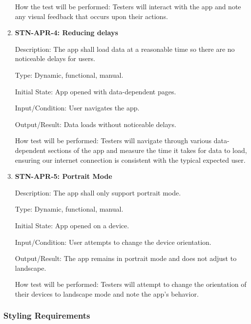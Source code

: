 \documentclass[12pt, titlepage]{article}
\begin{document}
\begin{enumerate}
        How the test will be performed: Testers will interact with the app and note any visual feedback that occurs upon their actions.


        \item \textbf{STN-APR-4: Reducing delays}

        Description: The app shall load data at a reasonable time so there are no noticeable delays for users.

        Type: Dynamic, functional, manual.

        Initial State: App opened with data-dependent pages.

        Input/Condition: User navigates the app.

        Output/Result: Data loads without noticeable delays.

        How test will be performed: Testers will navigate through various data-dependent sections of the app and measure the time it takes for data to load, ensuring our internet connection is consistent with the typical expected user.


        \item {\textbf{STN-APR-5: Portrait Mode}}

        Description: The app shall only support portrait mode.

        Type: Dynamic, functional, manual.

        Initial State: App opened on a device.

        Input/Condition: User attempts to change the device orientation.

        Output/Result: The app remains in portrait mode and does not adjust to landscape.

        How test will be performed: Testers will attempt to change the orientation of their devices to landscape mode and note the app's behavior.

    \end{enumerate}


    \subsubsection{Styling Requirements}
\end{document}
